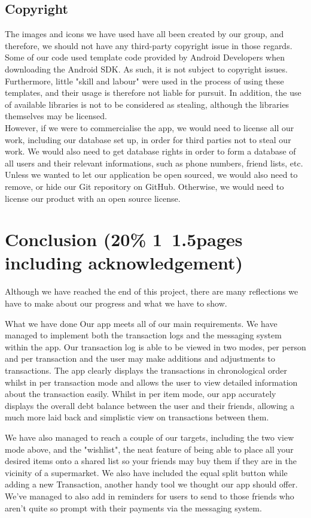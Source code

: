 \documentclass[a4paper,11pt]{article}
\begin{document}
\subsection*{Copyright}
The images and icons we have used have all been created by our group, and therefore, we should not have any third-party copyright issue in those regards.
Some of our code used template code provided by Android Developers when downloading the Android SDK. As such, it is not subject to copyright issues. Furthermore, little "skill and labour" were used in the process of using these templates, and their usage is therefore not liable for pursuit. In addition, the use of available libraries is not to be considered as stealing, although the libraries themselves may be licensed.\\
However, if we were to commercialise the app, we would need to license all our work, including our database set up, in order for third parties not to steal our work. We would also need to get database rights in order to form a database of all users and their relevant informations, such as phone numbers, friend lists, etc. \\
Unless we wanted to let our application be open sourced, we would also need to remove, or hide our Git repository on GitHub. Otherwise, we would need to license our product with an open source license.

\section*{Conclusion (20\% 1~1.5pages including acknowledgement)}
Although we have reached the end of this project, there are many reflections we have to make about our progress and what we have to show. 

What we have done
Our app meets all of our main requirements. We have managed to implement both the transaction logs and the messaging system within the app. Our transaction log is able to be viewed in two modes, per person and per transaction and the user may make additions and adjustments to transactions. The app clearly displays the transactions in chronological order whilst in per transaction mode and allows the user to view detailed information about the transaction easily. Whilst in per item mode, our app accurately displays the overall debt balance between the user and their friends, allowing a much more laid back and simplistic view on transactions between them.

We have also managed to reach a couple of our targets, including the two view mode above, and the "wishlist", the neat feature of being able to place all your desired items onto a shared list so your friends may buy them if they are in the vicinity of a supermarket. We also have included the equal split button while adding a new Transaction, another handy tool we thought our app should offer. We've managed to also add in reminders for users to send to those friends who aren't quite so prompt with their payments via the messaging system.
\end{document}
